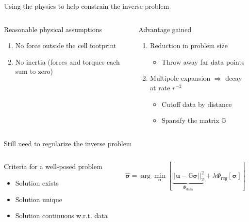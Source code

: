 \documentclass[presentation,aspectratio=169]{beamer}
\newcommand{\bsigma}{\boldsymbol\sigma}
\begin{document}
\begin{frame}{Using the physics to help constrain the inverse problem}
\small
\begin{columns}
\begin{column}{0.4\textwidth}
\begin{block}{Reasonable physical assumptions}
\begin{enumerate}
\item No force outside the cell footprint
\item No inertia (forces and torques each sum to zero)
\end{enumerate}
\end{block}
\end{column}
\begin{column}{0.5\textwidth}
 
\begin{exampleblock}{Advantage gained}
\begin{enumerate} \scriptsize
\item Reduction in problem size
\begin{itemize} \scriptsize
\item Throw away far data points
\end{itemize}
\item Multipole expansion $\Rightarrow$  decay at rate $r^{-2}$
\begin{itemize} \scriptsize
\item Cutoff data by distance
\item Sparsify the matrix $\mathbb{G}$
\end{itemize}
\end{enumerate}
\end{exampleblock}
\end{column}
\end{columns}

\begin{block}{Still need to regularize the inverse problem}

\begin{columns}
\begin{column}{0.4\textwidth}

Criteria for a well-posed problem
\begin{itemize}
\item Solution exists
\item Solution unique
\item Solution continuous w.r.t. data
\end{itemize}
\end{column}
\begin{column}{0.55\textwidth} \Large
\[
\hat{\boldsymbol\sigma} = \arg\min_{\boldsymbol\sigma}\left[ \underbrace{||\mathbf{u} - \mathbb{G}\mathbf{\bsigma}  ||_2^2}_{\Phi_{\textrm{data}}} + \lambda\Phi_{\textrm{reg}}[\boldsymbol\sigma] \right]
\]
\end{column}
\end{columns}

\end{block}

\end{frame}
\end{document}
